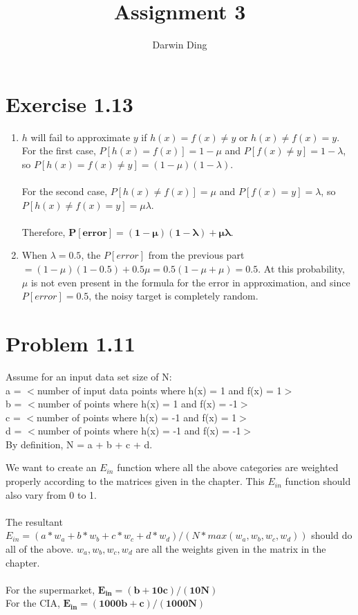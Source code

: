 \documentclass[12pt]{article}
\begin{document}
\title{Assignment 3}
\author{Darwin Ding}
\maketitle

\section*{Exercise 1.13}
\begin{enumerate}[label=(\alph*)]
	\item $h$ will fail to approximate $y$ if $h(x) = f(x) \ne y$ or $h(x) \ne f(x) = y$. For the first case, $P[h(x) = f(x)] = 1 - \mu$ and $P[f(x) \ne y] = 1 - \lambda$, so $P[h(x) = f(x) \ne y] = (1 - \mu)(1 - \lambda)$.
	\\ \\ For the second case, $P[h(x) \ne f(x)] = \mu$ and $P[f(x) = y] = \lambda$, so $P[h(x) \ne f(x) = y] = \mu\lambda$.
	\\ \\ Therefore, $\boldsymbol{P[error] = (1 - \mu)(1 - \lambda) + \mu\lambda}$.
	\item When $\lambda = 0.5$, the $P[error]$ from the previous part $= (1 - \mu)(1 - 0.5) + 0.5\mu = 0.5 (1 - \mu + \mu) = 0.5$. At this probability, $\mu$ is not even present in the formula for the error in approximation, and since $P[error] = 0.5$, the noisy target is completely random.
\end{enumerate}

\section*{Problem 1.11}
Assume for an input data set size of N:
\\ a = $<$number of input data points where h(x) = 1 and f(x) = 1$>$
\\ b = $<$number of points where h(x) = 1 and f(x) = -1$>$
\\ c = $<$number of points where h(x) = -1 and f(x) = 1$>$
\\ d = $<$number of points where h(x) = -1 and f(x) = -1$>$
\\ By definition, N = a + b + c + d.

We want to create an $E_{in}$ function where all the above categories are weighted properly according to the matrices given in the chapter. This $E_{in}$ function should also vary from 0 to 1.
\\ \\ The resultant $E_{in} = (a * w_a + b * w_b + c * w_c + d * w_d)/(N * max(w_a, w_b, w_c, w_d))$ should do all of the above. $w_a, w_b, w_c, w_d$ are all the weights given in the matrix in the chapter.
\\ \\ For the supermarket, $\boldsymbol{E_{in} = (b + 10c)/(10N)}$
\\ For the CIA, $\boldsymbol{E_{in} = (1000b + c)/(1000N)}$
\end{document}
